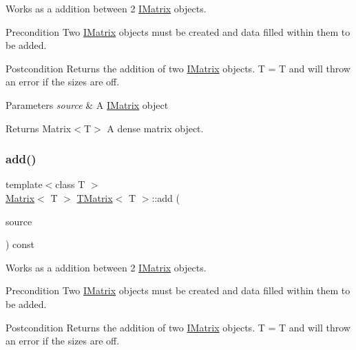 Works as a addition between 2 \mbox{\hyperlink{class_i_matrix}{I\+Matrix}} objects. 

\begin{DoxyPrecond}{Precondition}
Two \mbox{\hyperlink{class_i_matrix}{I\+Matrix}} objects must be created and data filled within them to be added. 
\end{DoxyPrecond}
\begin{DoxyPostcond}{Postcondition}
Returns the addition of two \mbox{\hyperlink{class_i_matrix}{I\+Matrix}} objects. T = T and will throw an error if the sizes are off.
\end{DoxyPostcond}

\begin{DoxyParams}{Parameters}
{\em source} & A \mbox{\hyperlink{class_i_matrix}{I\+Matrix}} object \\
\hline
\end{DoxyParams}
\begin{DoxyReturn}{Returns}
Matrix$<$\+T$>$ A dense matrix object. 
\end{DoxyReturn}
\mbox{\label{class_t_matrix_a7d1881d011aaafc2443c1dd7d6c07991}} 
\subsubsection{\texorpdfstring{add()}{add()}\hspace{0.1cm}{\footnotesize\ttfamily [6/6]}}
{\footnotesize\ttfamily template$<$class T $>$ \\
\mbox{\hyperlink{class_matrix}{Matrix}}$<$ T $>$ \mbox{\hyperlink{class_t_matrix}{T\+Matrix}}$<$ T $>$\+::add (\begin{DoxyParamCaption}\item[{const \mbox{\hyperlink{class_i_matrix}{I\+Matrix}}$<$ \mbox{\hyperlink{class_d_matrix}{D\+Matrix}}$<$ T $>$, T $>$ \&}]{source }\end{DoxyParamCaption}) const}



Works as a addition between 2 \mbox{\hyperlink{class_i_matrix}{I\+Matrix}} objects. 

\begin{DoxyPrecond}{Precondition}
Two \mbox{\hyperlink{class_i_matrix}{I\+Matrix}} objects must be created and data filled within them to be added. 
\end{DoxyPrecond}
\begin{DoxyPostcond}{Postcondition}
Returns the addition of two \mbox{\hyperlink{class_i_matrix}{I\+Matrix}} objects. T = T and will throw an error if the sizes are off.
\end{DoxyPostcond}

